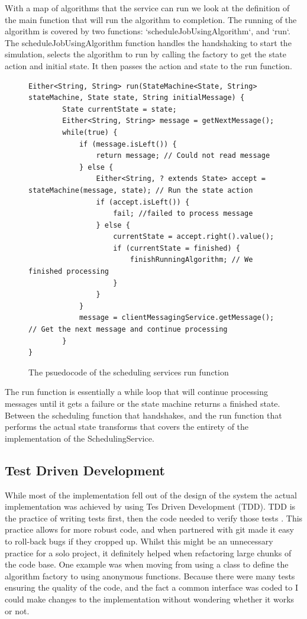 \documentclass[a4paper]{article} %
\begin{document}
\newline
With a map of algorithms that the service can run we look at the definition of the main function that will run the algorithm to completion.
The running of the algorithm is covered by two functions: `scheduleJobUsingAlgorithm`, and `run`.
The scheduleJobUsingAlgorithm function handles the handshaking to start the simulation, selects the algorithm to run by calling the factory to get the state action and initial state.
It then passes the action and state to the run function.
\newline

\begin{figure}[ht!]
\begin{lstlisting}
Either<String, String> run(StateMachine<State, String> stateMachine, State state, String initialMessage) {
        State currentState = state;
        Either<String, String> message = getNextMessage();
        while(true) {
            if (message.isLeft()) {
                return message; // Could not read message
            } else {
                Either<String, ? extends State> accept = stateMachine(message, state); // Run the state action
                if (accept.isLeft()) {
                    fail; //failed to process message
                } else {
                    currentState = accept.right().value();
                    if (currentState = finished) { 
                        finishRunningAlgorithm; // We finished processing
                    }
                }
            }
            message = clientMessagingService.getMessage(); // Get the next message and continue processing
        }
}
\end{lstlisting}
\label{run_psuedocode}
\caption{The psuedocode of the scheduling services run function}
\end{figure}
The run function is essentially a while loop that will continue processing messages until it gets a failure or the state machine returns a finished state. 
Between the scheduling function that handshakes, and the run function that performs the actual state transforms that covers the entirety of the implementation of the SchedulingService.
\subsection*{Test Driven Development}
While most of the implementation fell out of the design of the system the actual implementation was achieved by using Tes Driven Development (TDD).
TDD is the practice of writing tests first, then the code needed to verify those tests \cite{beck_2015}.
This practice allows for more robust code, and when partnered with git made it easy to roll-back bugs if they cropped up. 
Whilst this might be an unnecessary practice for a solo project, it definitely helped when refactoring large chunks of the code base.
One example was when moving from using a class to define the algorithm factory to using anonymous functions. 
Because there were many tests ensuring the quality of the code, and the fact a common interface was coded to I could make changes to the implementation without wondering whether it works or not.
\end{document}
